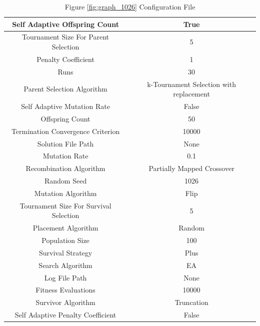 \documentclass{standalone}
\begin{document}
\begin{table}[!htb]
	\centering
	\caption{Figure \ref{fig:graph_1026} Configuration File}
	\label{tab:graph_1026}
	\begin{tabular}{| c | c |}
		\hline
		Self Adaptive Offspring Count		& True		 \\
		\hline
		Tournament Size For Parent Selection		& 5		 \\
		\hline
		Penalty Coefficient		& 1		 \\
		\hline
		Runs		& 30		 \\
		\hline
		Parent Selection Algorithm		& k-Tournament Selection with replacement		 \\
		\hline
		Self Adaptive Mutation Rate		& False		 \\
		\hline
		Offspring Count		& 50		 \\
		\hline
		Termination Convergence Criterion		& 10000		 \\
		\hline
		Solution File Path		& None		 \\
		\hline
		Mutation Rate		& 0.1		 \\
		\hline
		Recombination Algorithm		& Partially Mapped Crossover		 \\
		\hline
		Random Seed		& 1026		 \\
		\hline
		Mutation Algorithm		& Flip		 \\
		\hline
		Tournament Size For Survival Selection		& 5		 \\
		\hline
		Placement Algorithm		& Random		 \\
		\hline
		Population Size		& 100		 \\
		\hline
		Survival Strategy		& Plus		 \\
		\hline
		Search Algorithm		& EA		 \\
		\hline
		Log File Path		& None		 \\
		\hline
		Fitness Evaluations		& 10000		 \\
		\hline
		Survivor Algorithm		& Truncation		 \\
		\hline
		Self Adaptive Penalty Coefficient		& False		 \\
		\hline
	\end{tabular}
\end{table}
\end{document}
